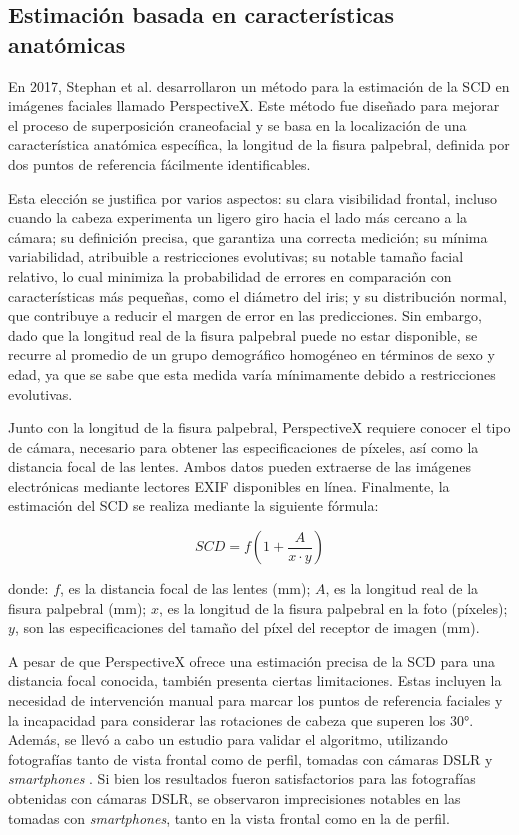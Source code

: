 \subsection{Estimación basada en características anatómicas}

En 2017, Stephan et al. \cite{20} desarrollaron un método para la estimación de la SCD en imágenes faciales llamado PerspectiveX. Este método fue diseñado para mejorar el proceso de superposición craneofacial y se basa en la localización de una característica anatómica específica, la longitud de la fisura palpebral, definida por dos puntos de referencia fácilmente identificables. 

Esta elección se justifica por varios aspectos: su clara visibilidad frontal, incluso cuando la cabeza experimenta un ligero giro hacia el lado más cercano a la cámara; su definición precisa, que garantiza una correcta medición; su mínima variabilidad, atribuible a restricciones evolutivas; su notable tamaño facial relativo, lo cual minimiza la probabilidad de errores en comparación con características más pequeñas, como el diámetro del iris; y su distribución normal, que contribuye a reducir el margen de error en las predicciones. Sin embargo, dado que la longitud real de la fisura palpebral puede no estar disponible, se recurre al promedio de un grupo demográfico homogéneo en términos de sexo y edad, ya que se sabe que esta medida varía mínimamente debido a restricciones evolutivas.

Junto con la longitud de la fisura palpebral, PerspectiveX requiere conocer el tipo de cámara, necesario para obtener las especificaciones de píxeles, así como la distancia focal de las lentes. Ambos datos pueden extraerse de las imágenes electrónicas mediante lectores EXIF disponibles en línea. Finalmente, la estimación del SCD se realiza mediante la siguiente fórmula:

\begin{equation}
	SCD = f (1+\frac{A}{x \cdot y})
\end{equation}

donde: $f$, es la distancia focal de las lentes (mm); $A$, es la longitud real de la fisura palpebral (mm); $x$, es la longitud de la fisura palpebral en la foto (píxeles); $y$, son las especificaciones del tamaño del píxel del receptor de imagen (mm).

A pesar de que PerspectiveX ofrece una estimación precisa de la SCD para una distancia focal conocida, también presenta ciertas limitaciones. Estas incluyen la necesidad de intervención manual para marcar los puntos de referencia faciales y la incapacidad para considerar las rotaciones de cabeza que superen los 30°. Además, se llevó a cabo un estudio para validar el algoritmo, utilizando fotografías tanto de vista frontal como de perfil, tomadas con cámaras DSLR y \textit{smartphones} \cite{70}. Si bien los resultados fueron satisfactorios para las fotografías obtenidas con cámaras DSLR, se observaron imprecisiones notables en las tomadas con \textit{smartphones}, tanto en la vista frontal como en la de perfil.

